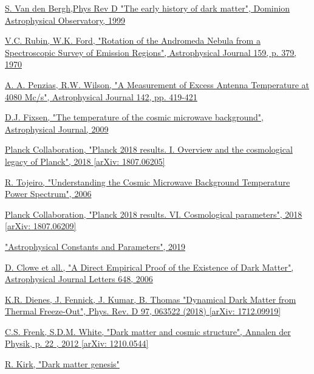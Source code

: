 \documentclass[a4paper, 10pt, openright]{report}
\begin{document}
\begin{thebibliography}{1}
\href{https://arxiv.org/pdf/astro-ph/9904251.pdf}{S. Van den Bergh,Phys Rev D
"The early history of dark matter",
Dominion Astrophysical Observatory, 1999
}

\href{https://ui.adsabs.harvard.edu/abs/1970ApJ...159..379R/abstract}{V.C. Rubin, W.K. Ford,
"Rotation of the Andromeda Nebula from a Spectroscopic Survey of Emission Regions",
Astrophysical Journal 159, p. 379, 1970
}

\href{https://ui.adsabs.harvard.edu/abs/1965ApJ...142..419P/abstract}{A. A. Penzias, R.W. Wilson,
"A Measurement of Excess Antenna Temperature at 4080 Mc/s",
Astrophysical Journal 142, pp. 419-421
}

\href{https://iopscience.iop.org/article/10.1088/0004-637X/707/2/916}{D.J. Fixsen,
"The temperature of the cosmic microwave background",
Astrophysical Journal, 2009
}

\href{https://arxiv.org/abs/1807.06205}{Planck Collaboration, 
"Planck 2018 results. I. Overview and the cosmological legacy of Planck", 2018 [arXiv: 1807.06205]
}


\href{https://www.roe.ac.uk/ifa/postgrad/pedagogy/2006_tojeiro.pdf}{R. Tojeiro,
"Understanding the Cosmic Microwave Background Temperature Power Spectrum",
2006
}

\href{https://arxiv.org/abs/1807.06209}{Planck Collaboration, 
"Planck 2018 results. VI. Cosmological parameters", 2018 [arXiv: 1807.06209]
}

\href{http://pdg.lbl.gov/2019/reviews/rpp2018-rev-astrophysical-constants.pdf}{
"Astrophysical Constants and Parameters", 
2019
}

\href{https://iopscience.iop.org/article/10.1086/508162}{D. Clowe et all.,
"A Direct Empirical Proof of the Existence of Dark Matter",
Astrophysical Journal Letters 648, 2006
}

\href{https://arxiv.org/pdf/1712.09919.pdf}{K.R. Dienes, J. Fennick, J. Kumar, B. Thomas
"Dynamical Dark Matter from Thermal Freeze-Out",
Phys. Rev. D 97, 063522 (2018) [arXiv: 1712.09919]
}

\href{https://arxiv.org/pdf/1210.0544.pdf}{C.S. Frenk, S.D.M. White,
"Dark matter and cosmic structure",
Annalen der Physik, p. 22 , 2012 [arXiv: 1210.0544]
}

\href{http://inspirehep.net/record/1683379/files/fulltext.pdf}{R. Kirk,
"Dark matter genesis"}


\end{thebibliography}
\end{document}
